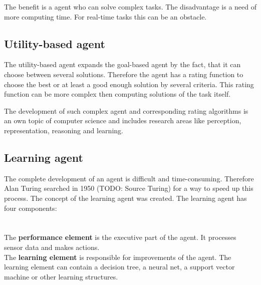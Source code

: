 \documentclass[10pt,a4paper,DIV=11]{scrreprt}
\begin{document}
The benefit is a agent who can solve complex tasks. The disadvantage is a need of more computing time. For real-time tasks this can be an obstacle.

\subsection{Utility-based agent}
The utility-based agent expands the goal-based agent by the fact, that it can choose between several solutions. Therefore the agent has a rating function to choose the best or at least a good enough solution by several criteria. This rating function can be more complex then computing solutions of the task itself.

The development of such complex agent and corresponding rating algorithms is an own topic of computer science and includes research areas like perception, representation, reasoning and learning.


\subsection{Learning agent}
The complete development of an agent is difficult and time-consuming. Therefore Alan Turing searched in 1950 (TODO: Source Turing) for a way to speed up this process. The concept of the learning agent was created. The learning agent has four components: \\

   \\
\\

The \textbf{performance element} is the executive part of the agent. It processes sensor data and makes actions. \\

The \textbf{learning element} is responsible for improvements of the agent. The learning element can contain a decision tree, a neural net, a support vector machine or other learning structures. \\
\end{document}
